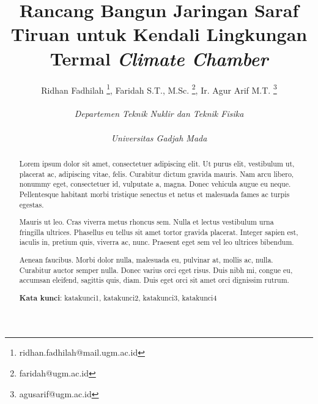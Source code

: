 \documentclass[a4paper,10pt]{article}
\title{\textbf{
Rancang Bangun Jaringan Saraf Tiruan untuk Kendali Lingkungan Termal \textit{Climate Chamber}
}}
\author{
Ridhan Fadhilah \thanks{ridhan.fadhilah@mail.ugm.ac.id}, 
Faridah S.T., M.Sc. \thanks{faridah@ugm.ac.id}, 
Ir. Agur Arif M.T. \thanks{agusarif@ugm.ac.id} \\ \\ 
\textit{Departemen Teknik Nuklir dan Teknik Fisika} \\ 
\texit{ Fakultas Teknik} \\
\textit{Universitas Gadjah Mada}}
\date{ }
\begin{document}
\maketitle

\begin{abstract}
    


Lorem ipsum dolor sit amet, consectetuer adipiscing elit. Ut purus elit, vestibulum ut,
placerat ac, adipiscing vitae, felis. Curabitur dictum gravida mauris. Nam arcu libero, nonummy
eget, consectetuer id, vulputate a, magna. Donec vehicula augue eu neque. Pellentesque habitant
morbi tristique senectus et netus et malesuada fames ac turpis egestas.

Mauris ut leo. Cras viverra metus rhoncus sem. Nulla et lectus vestibulum urna fringilla
ultrices. Phasellus eu tellus sit amet tortor gravida placerat. Integer sapien est, iaculis in, pretium
quis, viverra ac, nunc. Praesent eget sem vel leo ultrices bibendum.

Aenean faucibus. Morbi dolor nulla, malesuada eu, pulvinar at, mollis ac, nulla. Curabitur
auctor semper nulla. Donec varius orci eget risus. Duis nibh mi, congue eu, accumsan eleifend,
sagittis quis, diam. Duis eget orci sit amet orci dignissim rutrum.

\vspace{0.5cm}
\textbf{Kata kunci}: katakunci1, katakunci2, katakunci3, katakunci4

\end{abstract}
\end{document}
